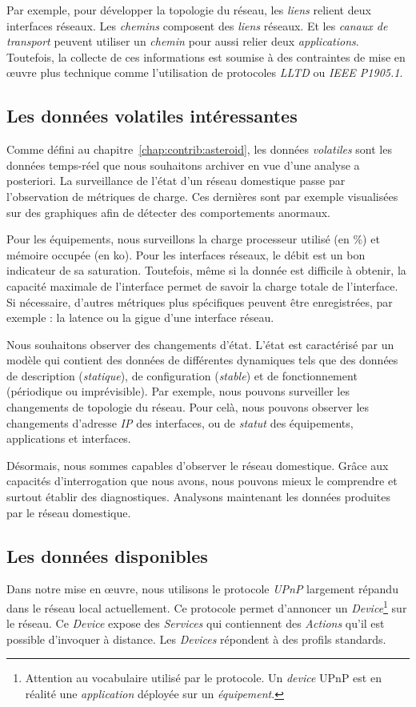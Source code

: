 Par exemple, pour développer la topologie du réseau, les \textit{liens} relient deux interfaces réseaux. Les \textit{chemins} composent des \textit{liens} réseaux. Et les \textit{canaux de transport} peuvent utiliser un \textit{chemin} pour aussi relier deux \textit{applications}. Toutefois, la collecte de ces informations est soumise à des contraintes de mise en œuvre plus technique comme l'utilisation de protocoles \textit{LLTD} ou \textit{IEEE P1905.1}.

\subsection{Les données volatiles intéressantes}
Comme défini au chapitre~\ref{chap:contrib:asteroid}, les données \textit{volatiles} sont les données temps-réel que nous souhaitons archiver en vue d'une analyse a posteriori. La surveillance de l'état d'un réseau domestique passe par l'observation de métriques de charge. Ces dernières sont par exemple visualisées sur des graphiques afin de détecter des comportements anormaux.

Pour les équipements, nous surveillons la charge processeur utilisé (en \%) et mémoire occupée (en ko). Pour les interfaces réseaux, le débit est un bon indicateur de sa saturation. Toutefois, même si la donnée est difficile à obtenir, la capacité maximale de l'interface permet de savoir la charge totale de l'interface. Si nécessaire, d'autres métriques plus spécifiques peuvent être enregistrées, par exemple : la latence ou la gigue d'une interface réseau.


Nous souhaitons observer des changements d'état. L'état est caractérisé par un modèle qui contient des données de différentes dynamiques tels que des données de description (\textit{statique}), de configuration (\textit{stable}) et de fonctionnement (périodique ou imprévisible). Par exemple, nous pouvons surveiller les changements de topologie du réseau. Pour celà, nous pouvons observer les changements d'adresse \textit{IP} des interfaces, ou de \textit{statut} des équipements, applications et interfaces.

Désormais, nous sommes capables d'observer le réseau domestique. Grâce aux capacités d'interrogation que nous avons, nous pouvons mieux le comprendre et surtout établir des diagnostiques. Analysons maintenant les données produites par le réseau domestique.

\subsection{Les données disponibles}\label{sec:valid:domvision:systeme:data}
Dans notre mise en œuvre, nous utilisons le protocole \textit{UPnP} largement répandu dans le réseau local actuellement. Ce protocole permet d'annoncer un \textit{Device}\footnote{Attention au vocabulaire utilisé par le protocole. Un \textit{device} UPnP est en réalité une \textit{application} déployée sur un \textit{équipement}.} sur le réseau. Ce \textit{Device} expose des \textit{Services} qui contiennent des \textit{Actions} qu'il est possible d'invoquer à distance. Les \textit{Devices} répondent à des profils standards.

